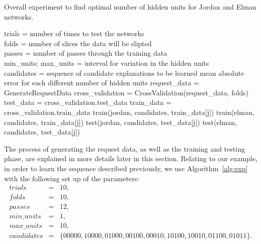 \newpage
\vspace*{\fill}
\begin{tcolorbox}
\begin{algorithm}
\label{alg:exp}
\normalfont
Overall experiment to find optimal number of hidden units for Jordan and Elman networks.
\begin{algorithmic}[1]
\REQUIRE trials = number of times to test the networks\\
\hspace{0.5cm} folds = number of slices the data will be slipted\\
\hspace{0.5cm} passes = number of passes through the training data\\
\hspace{0.5cm} min\_units; max\_units = interval for variation in the hidden units\\
\hspace{0.5cm} candidates = sequence of candidate explanations to be learned
\ENSURE mean absolute error for each different number of hidden units
\bigskip
{}
\STATE request\_data = GenerateRequestData
\STATE cross\_validation = CrossValidation(request\_data, folds)
\STATE test\_data = cross\_validation.test\_data
\STATE train\_data = cross\_validation.train\_data
			\STATE train(jordan, candidates, train\_data[j])
			\STATE train(elman, candidates, train\_data[j])
		\ENDFOR
		\STATE test(jordan, candidates, test\_data[j])
		\STATE test(elman, candidates, test\_data[j])
	\ENDFOR
	\ENDFOR
\ENDFOR
\ENDWHILE
\end{algorithmic}
\end{algorithm}
\end{tcolorbox}
\vspace*{\fill}
\newpage

The process of generating the request data, as well as the training and testing phase, are explained in more details later in this section. Relating to our example, in order to learn the sequence described previously, we use  Algorithm~\ref{alg:exp} with the following set up of the parameters:
\[
\begin{array}{lcl}
trials &=& 10, \\
folds &=& 10, \\
passes &=& 12, \\
min\_units &=& 1, \\
max\_units &=& 10, \\
candidates &=& \{00000, 10000, 01000, 00100, 00010, 10100, 10010, 01100, 01011\}. 
\end{array}
\]

